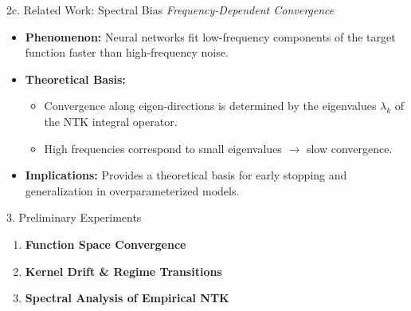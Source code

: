 \documentclass[10pt,aspectratio=169]{beamer}
\begin{document}
\begin{frame}{2c. Related Work: Spectral Bias}
	\textit{Frequency-Dependent Convergence}

	\begin{itemize}
		\item \textbf{Phenomenon:} Neural networks fit low-frequency components of the target function faster than high-frequency noise.
		\item \textbf{Theoretical Basis:}
		      \begin{itemize}
			      \item Convergence along eigen-directions is determined by the eigenvalues $\lambda_k$ of the NTK integral operator.
			      \item High frequencies correspond to small eigenvalues $\to$ slow convergence.
		      \end{itemize}
		\item \textbf{Implications:} Provides a theoretical basis for early stopping and generalization in overparameterized models.
	\end{itemize}
\end{frame}

\begin{frame}{3. Preliminary Experiments}
	\vspace{0.5cm}

	\begin{enumerate}
		\item \textbf{Function Space Convergence}

		      \vspace{0.4cm}

		\item \textbf{Kernel Drift \& Regime Transitions}

		      \vspace{0.4cm}

		\item \textbf{Spectral Analysis of Empirical NTK}
	\end{enumerate}
\end{frame}
\end{document}
